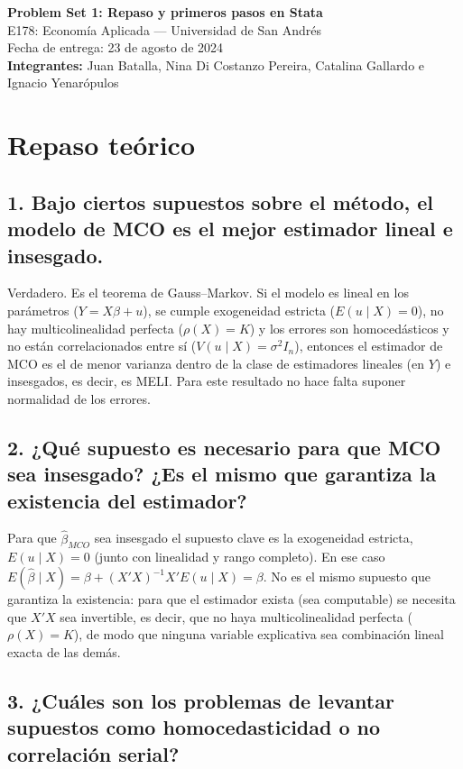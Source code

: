 \documentclass[11pt,a4paper]{article}
\begin{document}
\begin{center}
{\Large\bfseries Problem Set 1: Repaso y primeros pasos en Stata}\\[0.5em]
E178: Economía Aplicada --- Universidad de San Andrés\\
Fecha de entrega: 23 de agosto de 2024\\[0.5em]
\textbf{Integrantes:} Juan Batalla, Nina Di Costanzo Pereira, Catalina Gallardo e Ignacio Yenarópulos
\end{center}

\section*{Repaso teórico}

\subsection*{1. Bajo ciertos supuestos sobre el método, el modelo de MCO es el mejor estimador lineal e insesgado.}

Verdadero. Es el teorema de Gauss--Markov. Si el modelo es lineal en los parámetros ($Y = X\beta + u$), se cumple exogeneidad estricta ($E(u\mid X)=0$), no hay multicolinealidad perfecta ($\rho(X)=K$) y los errores son homocedásticos y no están correlacionados entre sí ($V(u\mid X)=\sigma^2 I_n$), entonces el estimador de MCO es el de menor varianza dentro de la clase de estimadores lineales (en $Y$) e insesgados, es decir, es MELI. Para este resultado no hace falta suponer normalidad de los errores.

\subsection*{2. ¿Qué supuesto es necesario para que MCO sea insesgado? ¿Es el mismo que garantiza la existencia del estimador?}

Para que $\hat\beta_{MCO}$ sea insesgado el supuesto clave es la exogeneidad estricta, $E(u\mid X)=0$ (junto con linealidad y rango completo). En ese caso $E(\hat\beta\mid X)=\beta + (X'X)^{-1}X'E(u\mid X)=\beta$. No es el mismo supuesto que garantiza la existencia: para que el estimador exista (sea computable) se necesita que $X'X$ sea invertible, es decir, que no haya multicolinealidad perfecta ($\rho(X)=K$), de modo que ninguna variable explicativa sea combinación lineal exacta de las demás.

\subsection*{3. ¿Cuáles son los problemas de levantar supuestos como homocedasticidad o no correlación serial?}
\end{document}
